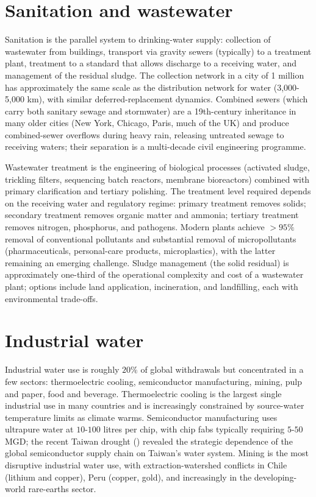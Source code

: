 \section{Sanitation and wastewater}

Sanitation is the parallel system to drinking-water supply: collection of wastewater from buildings, transport via gravity sewers (typically) to a treatment plant, treatment to a standard that allows discharge to a receiving water, and management of the residual sludge. The collection network in a city of 1 million has approximately the same scale as the distribution network for water (3,000-5,000 km), with similar deferred-replacement dynamics. Combined sewers (which carry both sanitary sewage and stormwater) are a 19th-century inheritance in many older cities (New York, Chicago, Paris, much of the UK) and produce combined-sewer overflows during heavy rain, releasing untreated sewage to receiving waters; their separation is a multi-decade civil engineering programme.

Wastewater treatment is the engineering of biological processes (activated sludge, trickling filters, sequencing batch reactors, membrane bioreactors) combined with primary clarification and tertiary polishing. The treatment level required depends on the receiving water and regulatory regime: primary treatment removes solids; secondary treatment removes organic matter and ammonia; tertiary treatment removes nitrogen, phosphorus, and pathogens. Modern plants achieve $>95\%$ removal of conventional pollutants and substantial removal of micropollutants (pharmaceuticals, personal-care products, microplastics), with the latter remaining an emerging challenge. Sludge management (the solid residual) is approximately one-third of the operational complexity and cost of a wastewater plant; options include land application, incineration, and landfilling, each with environmental trade-offs.

\section{Industrial water}

Industrial water use is roughly $20\%$ of global withdrawals but concentrated in a few sectors: thermoelectric cooling, semiconductor manufacturing, mining, pulp and paper, food and beverage. Thermoelectric cooling is the largest single industrial use in many countries and is increasingly constrained by source-water temperature limits as climate warms. Semiconductor manufacturing uses ultrapure water at $10$-$100$ litres per chip, with chip fabs typically requiring $5$-$50$ MGD; the recent Taiwan drought (\cite{paper:liao-taiwan-drought-2022}) revealed the strategic dependence of the global semiconductor supply chain on Taiwan's water system. Mining is the most disruptive industrial water use, with extraction-watershed conflicts in Chile (lithium and copper), Peru (copper, gold), and increasingly in the developing-world rare-earths sector.

